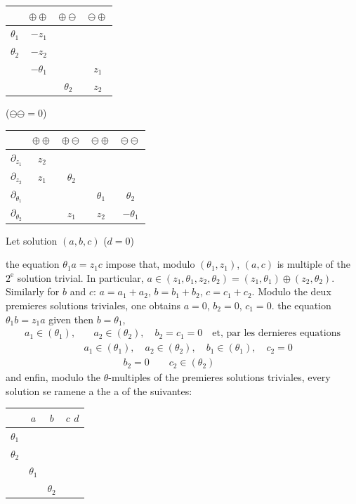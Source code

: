 \documentclass[11pt,a4paper]{article}
\theoremstyle{plain}
\theoremstyle{definition}
\begin{document}
\newpage

\begin{center}
\begin{tabular}{c|ccc}
& $\oplus\oplus$ & $\oplus\ominus$ & $\ominus\oplus$ \\
\hline
$\theta_1$ & $-z_1$ & & \\
$\theta_2$ & $-z_2$ & & \\
& $-\theta_1$ & & $z_1$ \\
& & $\theta_2$ & $z_2$
\end{tabular}
\qquad ($\ominus\ominus = 0$)
\end{center}
\begin{center}
\begin{tabular}{c|cccc}
& $\oplus\oplus$ & $\oplus\ominus$ & $\ominus\oplus$ & $\ominus\ominus$ \\
\hline
$\partial_{z_1}$ & $z_2$ & & & \\
$\partial_{z_2}$ & $z_1$ & $\theta_2$ & & \\
$\partial_{\theta_1}$ & & & $\theta_1$ & $\theta_2$ \\
$\partial_{\theta_2}$ & & $z_1$ & $z_2$ & $-\theta_1$
\end{tabular}
\end{center}

\hfill Let solution $(a,b,c)$ ($d = 0$)

the equation $\theta_1 a = z_1 c$ impose that, modulo $(\theta_1, z_1)$, $(a,c)$ is multiple of the $2^{\text{e}}$ solution trivial. In particular, $a \in (z_1, \theta_1, z_2, \theta_2) = (z_1, \theta_1) \oplus (z_2, \theta_2)$. Similarly for $b$ and $c$: $a = a_1 + a_2$, $b = b_1 + b_2$, $c = c_1 + c_2$. Modulo the deux premieres solutions triviales, one obtains $a = 0$, $b_2 = 0$, $c_1 = 0$. the equation $\theta_1 b = z_1 a$ given then $b = \theta_1$,
\[
\begin{aligned}
a_1 \in (\theta_1), &\quad a_2 \in (\theta_2), \quad b_2 = c_1 = 0 \quad \text{et, par les dernieres equations} \\
& a_1 \in (\theta_1), \quad a_2 \in (\theta_2), \quad b_1 \in (\theta_1), \quad c_2 = 0 \\
& \qquad\qquad b_2 = 0 \qquad c_2 \in (\theta_2)
\end{aligned}
\]
and enfin, modulo the $\theta$-multiples of the premieres solutions triviales, every solution se ramene a the a of the suivantes:

\begin{center}
\begin{tabular}{|c|ccc|}
\hline
& $a$ & $b$ & $c$ \quad $d$ \\
\hline
$\theta_1$ & & & \\
$\theta_2$ & & & \\
& $\theta_1$ & & \\
& & $\theta_2$ & \\
\hline
\end{tabular}
\end{center}
\end{document}
